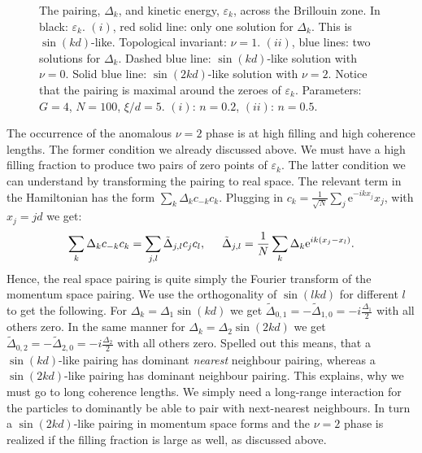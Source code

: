 \begin{figure}
\begin{center}

\caption{The pairing, $\Delta_k$, and kinetic energy, $\varepsilon_k$, across the Brillouin zone. In black: $\varepsilon_k$. $(i)$, red solid line: only one solution for $\Delta_k$. This is $\sin(kd)$-like. Topological invariant: $\nu = 1$. $(ii)$, blue lines: two solutions for $\Delta_k$. Dashed blue line: $\sin(kd)$-like solution with $\nu = 0$. Solid blue line: $\sin(2kd)$-like solution with $\nu = 2$. Notice that the pairing is maximal around the zeroes of $\varepsilon_k$. Parameters: $G = 4$, $N = 100$, $\xi / d = 5$. $(i)$: $n = 0.2$, $(ii)$: $n = 0.5$.}
\label{fig.Deltaexamples.t21.0}
\end{center}
\end{figure}

The occurrence of the anomalous $\nu = 2$ phase is at high filling and high coherence lengths. The former condition we already discussed above. We must have a high filling fraction to produce two pairs of zero points of $\varepsilon_k$. The latter condition we can understand by transforming the pairing to real space. The relevant term in the Hamiltonian has the form $\sum_k \Delta_k c_{-k}c_{k}$. Plugging in $c_k = \frac{1}{\sqrt{N}}\sum_j \text{e}^{-ikx_j}x_j$, with $x_j = jd$ we get:
\begin{equation}
\sum_k \Delta_k c_{-k}c_{k} = \sum_{j,l} \tilde{\Delta}_{j,l}c_jc_l, \hspace{0.5cm} \tilde{\Delta}_{j,l} = \frac{1}{N}\sum_k\Delta_k\text{e}^{ik(x_j-x_l)}. \nonumber
\end{equation}
Hence, the real space pairing is quite simply the Fourier transform of the momentum space pairing. We use the orthogonality of $\sin(lkd)$ for different $l$ to get the following. For $\Delta_k = \Delta_1\sin(kd)$ we get $\tilde{\Delta}_{0,1} = -\tilde{\Delta}_{1,0} = -i\frac{\Delta_1}{2}$ with all others zero. In the same manner for $\Delta_k = \Delta_2\sin(2kd)$ we get $\tilde{\Delta}_{0,2} = -\tilde{\Delta}_{2,0} = -i\frac{\Delta_2}{2}$ with all others zero. Spelled out this means, that a $\sin(kd)$-like pairing has dominant \textit{nearest} neighbour pairing, whereas a $\sin(2kd)$-like pairing has dominant  neighbour pairing. This explains, why we must go to long coherence lengths. We simply need a long-range interaction for the particles to dominantly be able to pair with next-nearest neighbours. In turn a $\sin(2kd)$-like pairing in momentum space forms and the $\nu = 2$ phase is realized if the filling fraction is large as well, as discussed above. 

